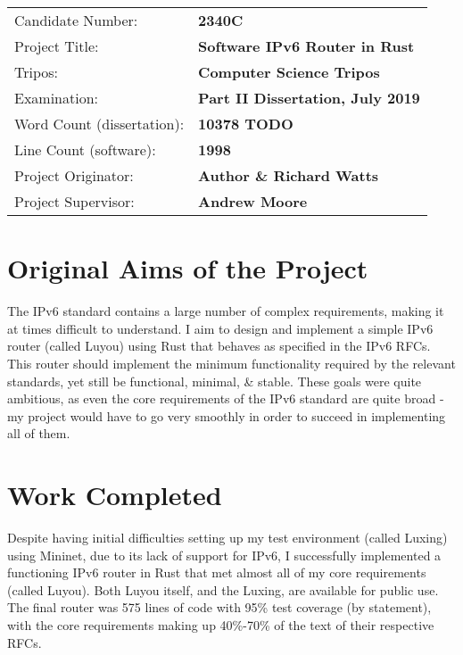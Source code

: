 \documentclass[12pt,a4paper,twoside,openright]{report}
\begin{document}
{\large
\begin{tabular}{ll}
Candidate Number:          & \bf 2340C                      \\
Project Title:             & \bf Software IPv6 Router in Rust \\
Tripos:                    & \bf Computer Science Tripos  \\
Examination:               & \bf Part II Dissertation, July 2019  \\
Word Count (dissertation): & \bf 10378 TODO\footnotemark[1]  \\
Line Count (software):     & \bf 1998 \footnotemark[2] \\
Project Originator:        & \bf Author \& Richard Watts \\
Project Supervisor:        & \bf Andrew Moore \\
\end{tabular}
}



\section*{Original Aims of the Project}

The IPv6 standard\cite{ipv6_rfc} contains a large number of complex requirements, making it at times difficult to understand. I aim to design and implement a simple IPv6 router (called Luyou) using Rust\cite{rust} that behaves as specified in the IPv6 RFCs. This router should implement the minimum functionality required by the relevant standards, yet still be functional, minimal, \& stable.  These goals were quite ambitious, as even the core requirements of the IPv6 standard are quite broad - my project would have to go very smoothly in order to succeed in implementing all of them.

\section*{Work Completed}

Despite having initial difficulties setting up my test environment (called Luxing) using Mininet\cite{mininet}, due to its lack of support for IPv6, I successfully implemented a functioning IPv6 router in Rust that met almost all of my core requirements (called Luyou). Both Luyou itself, and the Luxing, are available for public use.  The final router was 575 lines of code with 95\% test coverage (by statement), with the core requirements making up 40\%-70\% of the text of their respective RFCs. 
\end{document}
